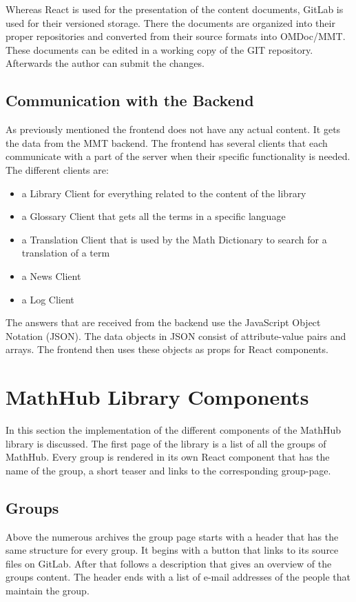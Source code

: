 \documentclass[11pt,a4paper]{article}
\begin{document}
Whereas React is used for the presentation of the content documents, GitLab is used for their versioned storage.
There the documents are organized into their proper repositories and converted from their source formats into OMDoc/MMT.
These documents can be edited in a working copy of the GIT repository.
Afterwards the author can submit the changes.

\subsection{Communication with the Backend}

As previously mentioned the frontend does not have any actual content.
It gets the data from the MMT backend.
The frontend has several clients that each communicate with a part of the server when their specific functionality is needed.
The different clients are:
\begin{itemize}
\item a Library Client for everything related to the content of the library
\item a Glossary Client that gets all the terms in a specific language
\item a Translation Client that is used by the Math Dictionary to search for a translation of a term 
\item a News Client
\item a Log Client
\end{itemize}

The answers that are received from the backend use the JavaScript Object Notation (JSON).
The data objects in JSON consist of attribute-value pairs and arrays.
The frontend then uses these objects as props for React components.


\section{MathHub Library Components}
In this section the implementation of the different components of the MathHub library is discussed.
The first page of the library is a list of all the groups of MathHub.
Every group is rendered in its own React component that has the name of the group, a short teaser and links to the corresponding group-page.

\subsection{Groups}
Above the numerous archives the group page starts with a header that has the same structure for every group.
It begins with a button that links to its source files on GitLab.
After that follows a description that gives an overview of the groups content.
The header ends with a list of e-mail addresses of the people that maintain the group. 
\end{document}
